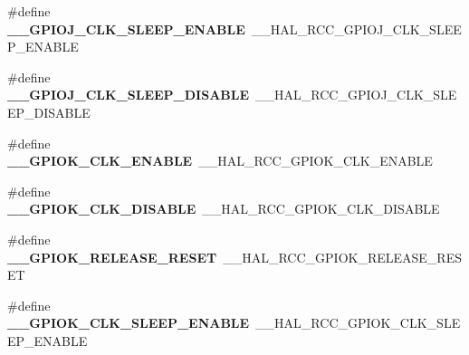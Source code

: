 \begin{DoxyCompactItemize}
\item 
\hypertarget{group___h_a_l___r_c_c___aliased_ga6545a12e39e58f09b423f98d40e4e30f}{\#define {\bfseries \-\_\-\-\_\-\-G\-P\-I\-O\-J\-\_\-\-C\-L\-K\-\_\-\-S\-L\-E\-E\-P\-\_\-\-E\-N\-A\-B\-L\-E}~\-\_\-\-\_\-\-H\-A\-L\-\_\-\-R\-C\-C\-\_\-\-G\-P\-I\-O\-J\-\_\-\-C\-L\-K\-\_\-\-S\-L\-E\-E\-P\-\_\-\-E\-N\-A\-B\-L\-E}\label{group___h_a_l___r_c_c___aliased_ga6545a12e39e58f09b423f98d40e4e30f}

\item 
\hypertarget{group___h_a_l___r_c_c___aliased_gabd552e9494e8331c78f930d7b6667c5e}{\#define {\bfseries \-\_\-\-\_\-\-G\-P\-I\-O\-J\-\_\-\-C\-L\-K\-\_\-\-S\-L\-E\-E\-P\-\_\-\-D\-I\-S\-A\-B\-L\-E}~\-\_\-\-\_\-\-H\-A\-L\-\_\-\-R\-C\-C\-\_\-\-G\-P\-I\-O\-J\-\_\-\-C\-L\-K\-\_\-\-S\-L\-E\-E\-P\-\_\-\-D\-I\-S\-A\-B\-L\-E}\label{group___h_a_l___r_c_c___aliased_gabd552e9494e8331c78f930d7b6667c5e}

\item 
\hypertarget{group___h_a_l___r_c_c___aliased_gaf00d84e5f7050eee401fb7f6e23a69c2}{\#define {\bfseries \-\_\-\-\_\-\-G\-P\-I\-O\-K\-\_\-\-C\-L\-K\-\_\-\-E\-N\-A\-B\-L\-E}~\-\_\-\-\_\-\-H\-A\-L\-\_\-\-R\-C\-C\-\_\-\-G\-P\-I\-O\-K\-\_\-\-C\-L\-K\-\_\-\-E\-N\-A\-B\-L\-E}\label{group___h_a_l___r_c_c___aliased_gaf00d84e5f7050eee401fb7f6e23a69c2}

\item 
\hypertarget{group___h_a_l___r_c_c___aliased_ga90f5f4d0c32f259a4cdc27b0321ed877}{\#define {\bfseries \-\_\-\-\_\-\-G\-P\-I\-O\-K\-\_\-\-C\-L\-K\-\_\-\-D\-I\-S\-A\-B\-L\-E}~\-\_\-\-\_\-\-H\-A\-L\-\_\-\-R\-C\-C\-\_\-\-G\-P\-I\-O\-K\-\_\-\-C\-L\-K\-\_\-\-D\-I\-S\-A\-B\-L\-E}\label{group___h_a_l___r_c_c___aliased_ga90f5f4d0c32f259a4cdc27b0321ed877}

\item 
\hypertarget{group___h_a_l___r_c_c___aliased_ga3a1d57ca9cb48a1fab12865a28e37c86}{\#define {\bfseries \-\_\-\-\_\-\-G\-P\-I\-O\-K\-\_\-\-R\-E\-L\-E\-A\-S\-E\-\_\-\-R\-E\-S\-E\-T}~\-\_\-\-\_\-\-H\-A\-L\-\_\-\-R\-C\-C\-\_\-\-G\-P\-I\-O\-K\-\_\-\-R\-E\-L\-E\-A\-S\-E\-\_\-\-R\-E\-S\-E\-T}\label{group___h_a_l___r_c_c___aliased_ga3a1d57ca9cb48a1fab12865a28e37c86}

\item 
\hypertarget{group___h_a_l___r_c_c___aliased_ga1803ca1023d1e973906ea33217213506}{\#define {\bfseries \-\_\-\-\_\-\-G\-P\-I\-O\-K\-\_\-\-C\-L\-K\-\_\-\-S\-L\-E\-E\-P\-\_\-\-E\-N\-A\-B\-L\-E}~\-\_\-\-\_\-\-H\-A\-L\-\_\-\-R\-C\-C\-\_\-\-G\-P\-I\-O\-K\-\_\-\-C\-L\-K\-\_\-\-S\-L\-E\-E\-P\-\_\-\-E\-N\-A\-B\-L\-E}\label{group___h_a_l___r_c_c___aliased_ga1803ca1023d1e973906ea33217213506}


\end{DoxyCompactItemize}
